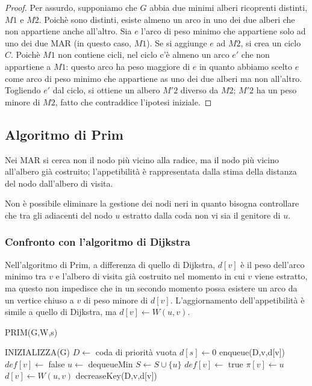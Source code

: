 \documentclass[11pt]{article}
\begin{document}
\begin{proof}
    Per assurdo, supponiamo che $G$ abbia due minimi alberi ricoprenti distinti, $M1$ e $M2$. Poichè sono distinti, esiste 
    almeno un arco in uno dei due alberi che non appartiene anche all'altro. Sia $e$ l'arco di peso minimo che appartiene 
    solo ad uno dei due MAR (in questo caso, $M1$). Se si aggiunge $e$ ad $M2$, si crea un ciclo $C$. Poichè $M1$ non 
    contiene cicli, nel ciclo c'è almeno un arco $e'$ che non appartiene a $M1$: questo arco ha peso maggiore di $e$ in 
    quanto abbiamo scelto $e$ come arco di peso minimo che appartiene as uno dei due alberi ma non all'altro.\\
    Togliendo $e'$ dal ciclo, si ottiene un albero $M'2$ diverso da $M2$; $M'2$ ha un peso minore di $M2$, fatto che contraddice 
    l'ipotesi iniziale.
\end{proof}
\subsection{Algoritmo di Prim}
Nei MAR si cerca non il nodo più vicino alla radice, ma il nodo più vicino all'albero già costruito; l'appetibilità è 
rappresentata dalla stima della distanza del nodo dall'albero di visita.

Non è possibile eliminare la gestione dei nodi neri in quanto bisogna controllare che tra gli adiacenti del nodo $u$ estratto 
dalla coda non vi sia il genitore di $u$.
\subsubsection{Confronto con l'algoritmo di Dijkstra}
Nell'algoritmo di Prim, a differenza di quello di Dijkstra, $d[v]$ è il peso dell'arco minimo tra $v$ e l'albero di visita 
già costruito nel momento in cui $v$ viene estratto, ma questo non impedisce che in un secondo momento possa esistere un 
arco da un vertice chiuso a $v$ di peso minore di $d[v]$.
L'aggiornamento dell'appetibilità è simile a quello di Dijkstra, ma $d[v]\leftarrow W(u,v)$.
\begin{algorithm}
    \caption{PRIM(G,W,s)}
    \begin{algorithmic}
        \State INIZIALIZZA(G)
        \State $D\gets$ coda di priorità vuota 
        \State $d[s]\gets 0$
            \State enqueue(D,v,d[v])
            \State $def[v]\gets$ false
        \EndFor
            \State $u\gets$ dequeueMin
            \State $S\gets S\cup \{u\}$
            \State $def[v]\gets$ true 
                \State $\pi[v]\gets u$
                \State $d[v]\gets W(u,v)$
                \State decreaseKey(D,v,d[v])
                \EndIf 
            \EndFor 
        \EndWhile
    \end{algorithmic}
\end{algorithm}
\end{document}
